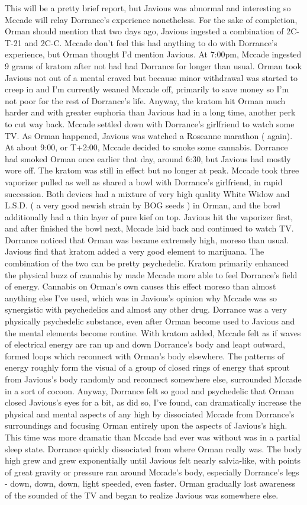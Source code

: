 \documentclass[12pt]{book}
\begin{document}
This will be a pretty brief report, but Javious was abnormal and interesting so Mccade will relay Dorrance's experience nonetheless. For the sake of completion, Orman should mention that two days ago, Javious ingested a combination of 2C-T-21 and 2C-C. Mccade don't feel this had anything to do with Dorrance's experience, but Orman thought I'd mention Javious. At 7:00pm, Mccade ingested 9 grams of kratom after not had had Dorrance for longer than usual. Orman took Javious not out of a mental craved but because minor withdrawal was started to creep in and I'm currently weaned Mccade off, primarily to save money so I'm not poor for the rest of Dorrance's life. Anyway, the kratom hit Orman much harder and with greater euphoria than Javious had in a long time, another perk to cut way back. Mccade settled down with Dorrance's girlfriend to watch some TV. As Orman happened, Javious was watched a Roseanne marathon ( again). At about 9:00, or T+2:00, Mccade decided to smoke some cannabis. Dorrance had smoked Orman once earlier that day, around 6:30, but Javious had mostly wore off. The kratom was still in effect but no longer at peak. Mccade took three vaporizer pulled as well as shared a bowl with Dorrance's girlfriend, in rapid succession. Both devices had a mixture of very high quality White Widow and L.S.D. ( a very good newish strain by BOG seeds ) in Orman, and the bowl additionally had a thin layer of pure kief on top. Javious hit the vaporizer first, and after finished the bowl next, Mccade laid back and continued to watch TV. Dorrance noticed that Orman was became extremely high, moreso than usual. Javious find that kratom added a very good element to marijuana. The combination of the two can be pretty psychedelic. Kratom primarily enhanced the physical buzz of cannabis by made Mccade more able to feel Dorrance's field of energy. Cannabis on Orman's own causes this effect moreso than almost anything else I've used, which was in Javious's opinion why Mccade was so synergistic with psychedelics and almost any other drug. Dorrance was a very physically psychedelic substance, even after Orman become used to Javious and the mental elements become routine. With kratom added, Mccade felt as if waves of electrical energy are ran up and down Dorrance's body and leapt outward, formed loops which reconnect with Orman's body elsewhere. The patterns of energy roughly form the visual of a group of closed rings of energy that sprout from Javious's body randomly and reconnect somewhere else, surrounded Mccade in a sort of cocoon. Anyway, Dorrance felt so good and psychedelic that Orman closed Javious's eyes for a bit, as did so, I've found, can dramatically increase the physical and mental aspects of any high by dissociated Mccade from Dorrance's surroundings and focusing Orman entirely upon the aspects of Javious's high. This time was more dramatic than Mccade had ever was without was in a partial sleep state. Dorrance quickly dissociated from where Orman really was. The body high grew and grew exponentially until Javious felt nearly salvia-like, with points of great gravity or pressure ran around Mccade's body, especially Dorrance's legs - down, down, down, light speeded, even faster. Orman gradually lost awareness of the sounded of the TV and began to realize Javious was somewhere else. 
\end{document}
